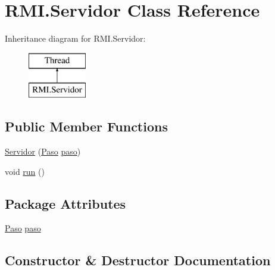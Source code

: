 \hypertarget{class_r_m_i_1_1_servidor}{}\section{R\+M\+I.\+Servidor Class Reference}
\label{class_r_m_i_1_1_servidor}
Inheritance diagram for R\+M\+I.\+Servidor\+:\begin{figure}[H]
\begin{center}
\leavevmode
\includegraphics[height=2.000000cm]{class_r_m_i_1_1_servidor}
\end{center}
\end{figure}
\subsection*{Public Member Functions}
\begin{DoxyCompactItemize}
\item 
\mbox{\hyperlink{class_r_m_i_1_1_servidor_a9740db5a1cb079d4b21777bc5ab63991}{Servidor}} (\mbox{\hyperlink{class_r_m_i_1_1_paso}{Paso}} \mbox{\hyperlink{class_r_m_i_1_1_servidor_a1238b87a5a8e06c6e59a187b3bb573ee}{paso}})
\item 
void \mbox{\hyperlink{class_r_m_i_1_1_servidor_afd5edbb2a15b3340e981a9e0833484f9}{run}} ()
\end{DoxyCompactItemize}
\subsection*{Package Attributes}
\begin{DoxyCompactItemize}
\item 
\mbox{\hyperlink{class_r_m_i_1_1_paso}{Paso}} \mbox{\hyperlink{class_r_m_i_1_1_servidor_a1238b87a5a8e06c6e59a187b3bb573ee}{paso}}
\end{DoxyCompactItemize}


\subsection{Constructor \& Destructor Documentation}
\mbox{\label{class_r_m_i_1_1_servidor_a9740db5a1cb079d4b21777bc5ab63991}} 
